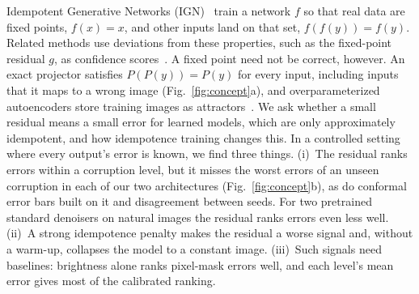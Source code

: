 \documentclass[10pt,twocolumn,a4paper]{article}
\begin{document}
Idempotent Generative Networks (IGN)~\cite{shocher2024ign} train a network $f$ so that real data
are fixed points, $f(x) = x$, and other inputs land on that set, $f(f(y)) = f(y)$. Related methods
use deviations from these properties, such as the fixed-point residual $g$, as confidence
scores~\cite{durasov2024zigzag,durasov2025it3,aljaff2025naign}. A fixed point need not be correct,
however. An exact projector satisfies $P(P(y)) = P(y)$ for every input, including inputs that it
maps to a wrong image (Fig.~\ref{fig:concept}a), and overparameterized autoencoders store training
images as attractors~\cite{radhakrishnan2020memory}. We ask whether a small residual means a small
error for learned models, which are only approximately idempotent, and how idempotence training
changes this. In a controlled setting where every output's error is known, we
find three things.
(i)~The residual ranks errors within a corruption level, but it misses the worst errors of an
unseen corruption in each of our two architectures (Fig.~\ref{fig:concept}b), as do conformal
error bars built on it and disagreement between seeds. For two pretrained standard denoisers on
natural images the residual ranks errors even less well.
(ii)~A strong idempotence penalty makes the residual a worse signal and, without a warm-up,
collapses the model to a constant image.
(iii)~Such signals need baselines: brightness alone ranks pixel-mask errors well, and each level's
mean error gives most of the calibrated ranking.
\end{document}
